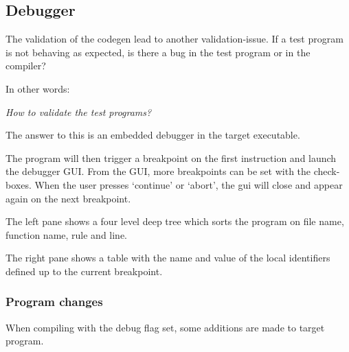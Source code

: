 \subsection{Debugger}\label{debugger}
The validation of the codegen lead to another validation-issue.
If a test program is not behaving as expected, is there a bug in the test program or in the compiler?

In other words:

\textit{How to validate the test programs?}

The answer to this is an embedded debugger in the target executable.


The program will then trigger a breakpoint on the first instruction and launch the debugger GUI.
From the GUI, more breakpoints can be set with the check-boxes.
When the user presses `continue' or `abort', the gui will close and appear again on the next breakpoint.

The left pane shows a four level deep tree which sorts the program on file name, function name, rule and line.

The right pane shows a table with the name and value of the local identifiers defined up to the current breakpoint.

\subsubsection{Program changes}
When compiling with the debug flag set, some additions are made to target program.

